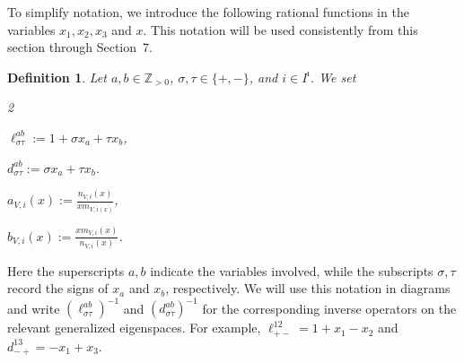 \documentclass[a4,10pt]{amsart}
\numberwithin{equation}{section}
\newtheorem{Defn}[Theorem]{Definition}
\theoremstyle{definition}
\begin{document}
To simplify notation, we introduce the following  rational functions in the variables $x_1, x_2, x_3$ and $x$. 
This notation will be used consistently from this section through Section~7.
\begin{Defn}\label{ration111}  Let $a,b\in \mathbb{Z}_{>0}$, $\sigma,\tau\in\{+,-\}$, and $i\in I^\imath$. We set 
\begin{multicols}{2} \item [(1)]
$\ell^{ab}_{\sigma\tau}:=1+\sigma x_a+\tau x_b$, \item [(2)] $d^{ab}_{\sigma\tau}:=\sigma x_a+\tau x_b$.
 \item [(3)]  $a_{V,i}(x):=\frac{n_{V,i}(x)}  {xm_{{V,i}(x)}}$, 
 \item [(4)] $b_{V,i}(x):=\frac{x m_{V,i}(x)}{n_{V,i}(x)}$.\end{multicols}
\end{Defn}
Here the superscripts $a,b$ indicate the variables involved, while the subscripts $\sigma,\tau$ record the signs of $x_a$ and $x_b$, respectively. We will use this  notation in diagrams and write
\(
(\ell^{ab}_{\sigma\tau})^{-1}
\)
and
\(
(d^{ab}_{\sigma\tau})^{-1}
\)
for the corresponding  inverse operators on the relevant generalized eigenspaces. For example,
$
\ell^{12}_{+-}=1+x_1-x_2$ and $
d^{13}_{-+}=-x_1+x_3$.
\end{document}

